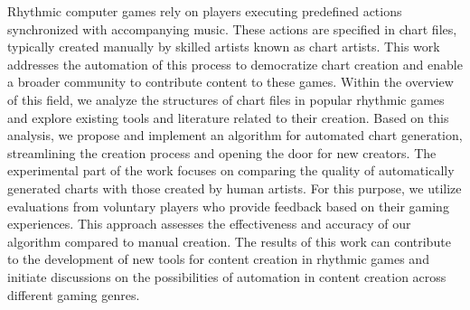 Rhythmic computer games rely on players executing predefined actions synchronized with accompanying music. These actions are specified in chart files, typically created manually by skilled artists known as chart artists. This work addresses the automation of this process to democratize chart creation and enable a broader community to contribute content to these games. Within the overview of this field, we analyze the structures of chart files in popular rhythmic games and explore existing tools and literature related to their creation. Based on this analysis, we propose and implement an algorithm for automated chart generation, streamlining the creation process and opening the door for new creators. The experimental part of the work focuses on comparing the quality of automatically generated charts with those created by human artists. For this purpose, we utilize evaluations from voluntary players who provide feedback based on their gaming experiences. This approach assesses the effectiveness and accuracy of our algorithm compared to manual creation. The results of this work can contribute to the development of new tools for content creation in rhythmic games and initiate discussions on the possibilities of automation in content creation across different gaming genres.
